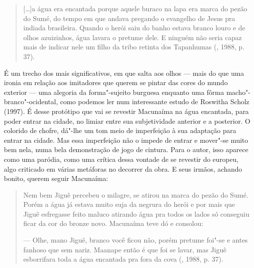 \begin{quote}
[\ldots{}]a água era encantada porque aquele buraco na lapa era marca do
pezão do Sumé, do tempo em que andava pregando o evangelho de Jesus pra
indiada brasileira. Quando o herói saiu do banho estava branco louro e
de olhos azuizinhos, água lavara o pretume dele. E ninguém não seria
capaz mais de indicar nele um filho da tribo retinta dos Tapanhumas
(, 1988, p. 37).
\end{quote}

É um trecho dos mais significativos, em que salta aos olhos --- mais do
que uma ironia em relação aos imitadores que querem se pintar das cores
do mundo exterior --- uma alegoria da forma"-sujeito burguesa enquanto uma
fôrma macho"-branco"-ocidental, como podemos ler num interessante estudo
de Roswitha Scholz (1997). É desse protótipo que vai se revestir
Macunaíma na água encantada, para poder entrar na cidade, no limiar
entre sua subjetividade anterior e a posterior. O colorido de chofre,
dá"-lhe um tom meio de imperfeição à sua adaptação para entrar na cidade.
Mas essa imperfeição não o impede de entrar e mover"-se muito bem nela,
numa bela demonstração de jogo de cintura. Para o autor, isso aparece
como uma paródia, como uma crítica dessa vontade de se revestir do
europeu, algo criticado em várias metáforas no decorrer da obra. E seus
irmãos, achando bonito, querem seguir Macunaíma:

\begin{quote}
Nem bem Jiguê percebeu o milagre, se atirou na marca do pezão do Sumé.
Porém a água já estava muito suja da negrura do herói e por mais que
Jiguê esfregasse feito maluco atirando água pra todos os lados só
conseguiu ficar da cor do bronze novo. Macunaíma teve dó e consolou:

--- Olhe, mano Jiguê, branco você ficou não, porém pretume foi"-se e
antes fanhoso que sem nariz. Maanape então é que foi se lavar, mas Jiguê
esborrifara toda a água encantada pra fora da cova (, 1988, p. 37).
\end{quote}

